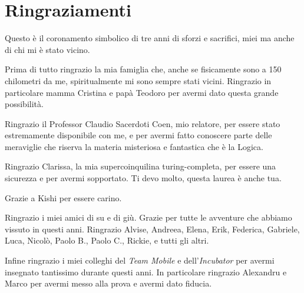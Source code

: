 \documentclass[12pt,a4paper]{mimosis}
\begin{document}
\printbibliography

\chapter*{Ringraziamenti}
Questo è il coronamento simbolico di tre anni di sforzi e sacrifici, miei ma anche di chi mi
è stato vicino.

Prima di tutto ringrazio la mia famiglia che, anche se fisicamente sono a 150 chilometri
da me, spiritualmente mi sono sempre stati vicini.
Ringrazio in particolare mamma Cristina e papà Teodoro per avermi dato questa grande 
possibilità.

Ringrazio il Professor Claudio Sacerdoti Coen, mio relatore, per essere stato estremamente
disponibile con me, e per avermi fatto conoscere parte delle meraviglie che riserva la
materia misteriosa e fantastica che è la Logica.

Ringrazio Clarissa, la mia supercoinquilina turing-completa, per essere una
sicurezza e per avermi sopportato. Ti devo molto, questa laurea è anche tua.

Grazie a Kishi per essere carino.

Ringrazio i miei amici di su e di giù. Grazie per tutte le avventure che abbiamo 
vissuto in questi anni. Ringrazio Alvise, Andreea, Elena, Erik,
Federica, Gabriele, Luca, Nicolò, Paolo B., Paolo C., Rickie, e tutti gli altri.

Infine ringrazio i miei colleghi del \textit{Team Mobile} e dell'\textit{Incubator}
per avermi insegnato tantissimo durante questi anni. In particolare ringrazio Alexandru e Marco per
avermi messo alla prova e avermi dato fiducia.
\end{document}
